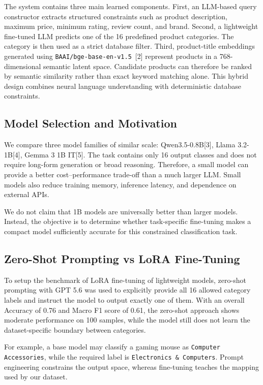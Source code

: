 \documentclass{article}
\begin{document}
The system contains three main learned components. First, an LLM-based query constructor extracts structured constraints such as
product description, maximum price, minimum rating, review count, and brand. Second, a lightweight fine-tuned LLM predicts one of the 16 predefined product
categories. The category is then used as a strict database filter. Third, product-title embeddings generated using
\texttt{BAAI/bge-base-en-v1.5}~[2] represent products in a 768-dimensional
semantic latent space. Candidate products can therefore be ranked by semantic
similarity rather than exact keyword matching alone. This hybrid design combines neural language understanding with deterministic
database constraints.

\subsection{Model Selection and Motivation}

We compare three model families of similar scale:    Qwen3.5-0.8B[3], Llama 3.2-1B[4], Gemma 3 1B IT[5]. The task contains only 16 output classes and does not require long-form
generation or broad reasoning. Therefore, a small model can provide a better
cost--performance trade-off than a much larger LLM. Small models also reduce
training memory, inference latency, and dependence on external APIs.

We do not claim that 1B models are universally better than larger models.
Instead, the objective is to determine whether task-specific fine-tuning makes
a compact model sufficiently accurate for this constrained classification
task.

\subsection{Zero-Shot Prompting vs LoRA Fine-Tuning}

To setup the benchmark of LoRA fine-tuning of lightweight models, zero-shot 
prompting with GPT 5.6 was used to explicitly provide all 16 allowed category labels and 
instruct the model to output exactly one of
them. With an overall Accuracy of 0.76 and Macro F1 score of 0.61, the zero-shot approach shows moderate performance on 100 samples, while the model still does not learn the
dataset-specific boundary between categories.

For example, a base model may classify a gaming mouse as
\texttt{Computer Accessories}, while the required label is
\texttt{Electronics \& Computers}. Prompt engineering constrains the output
space, whereas fine-tuning teaches the mapping used by our dataset.
\end{document}
